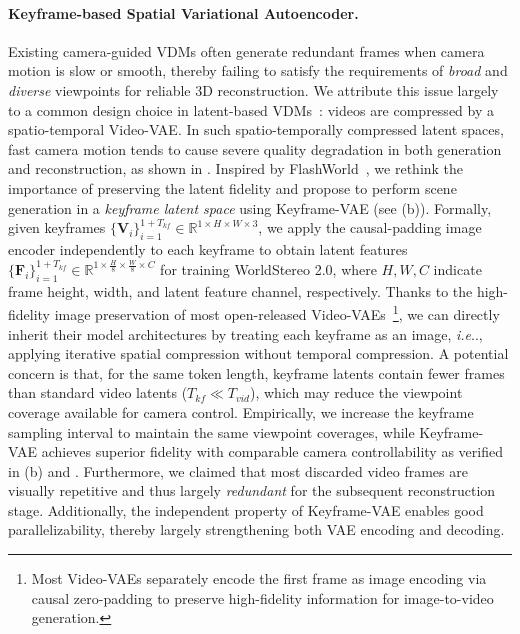 \documentclass{article} %
\makeatletter
\DeclareRobustCommand\onedot{\futurelet\@let@token\@onedot}
\def\@onedot{\ifx\@let@token.\else.\null\fi\xspace}
\def\ie{\emph{i.e}\onedot} \def\Ie{\emph{I.e}\onedot}
\makeatother
\begin{document}
\paragraph{Keyframe-based Spatial Variational Autoencoder.}
\label{sec:keyframe}
Existing camera-guided VDMs often generate redundant frames when camera motion is slow or smooth, thereby failing to satisfy the requirements of \emph{broad} and \emph{diverse} viewpoints for reliable 3D reconstruction.
We attribute this issue largely to a common design choice in latent-based VDMs~\cite{yang2025cogvideox,wang2025wan,hunyuanvideo2025}: videos are compressed by a spatio-temporal Video-VAE.
In such spatio-temporally compressed latent spaces, fast camera motion tends to cause severe quality degradation in both generation and reconstruction, as shown in .
Inspired by FlashWorld~\cite{yang2025flash}, we rethink the importance of preserving the latent fidelity and propose to perform scene generation in a \emph{keyframe latent space} using Keyframe-VAE (see (b)).
Formally, given keyframes $\{\mathbf{V}_i\}_{i=1}^{1+T_{kf}}\in\mathbb{R}^{1\times H\times W\times 3}$, we apply the causal-padding image encoder independently to each keyframe to obtain latent features $\{\mathbf{F}_i\}_{i=1}^{1+T_{kf}}\in\mathbb{R}^{1\times \frac{H}{8}\times \frac{W}{8}\times C}$ for training WorldStereo 2.0, where $H,W,C$ indicate frame height, width, and latent feature channel, respectively. 
Thanks to the high-fidelity image preservation of most open-released Video-VAEs~\cite{yang2025cogvideox,kong2024hunyuanvideo,wang2025wan,hunyuanvideo2025}\footnote{Most Video-VAEs separately encode the first frame as image encoding via causal zero-padding to preserve high-fidelity information for image-to-video generation.}, we can directly inherit their model architectures by treating each keyframe as an image, \ie, applying iterative spatial compression without temporal compression.
A potential concern is that, for the same token length, keyframe latents contain fewer frames than standard video latents ($T_{kf}\ll T_{vid}$), which may reduce the viewpoint coverage available for camera control.
Empirically, we increase the keyframe sampling interval to maintain the same viewpoint coverages, while Keyframe-VAE achieves superior fidelity with comparable camera controllability as verified in (b) and . 
Furthermore, we claimed that most discarded video frames are visually repetitive and thus largely \emph{redundant} for the subsequent reconstruction stage.
Additionally, the independent property of Keyframe-VAE enables good parallelizability, thereby largely strengthening both VAE encoding and decoding.
\end{document}
